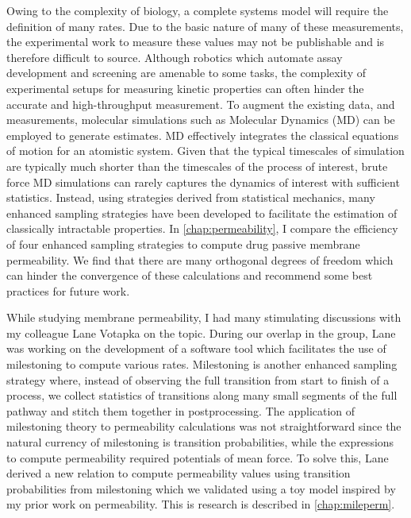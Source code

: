 \par Owing to the complexity of biology, a complete systems model will require the definition of many rates.
Due to the basic nature of many of these measurements, the experimental work to measure these values may not be publishable and is therefore difficult to source.
Although robotics which automate assay development and screening are amenable to some tasks, the complexity of experimental setups for measuring kinetic properties can often hinder the accurate and high-throughput measurement.
To augment the existing data, and measurements, molecular simulations such as Molecular Dynamics (MD) can be employed to generate estimates\cite{Leach2001,Durrant2011a}.
MD effectively integrates the classical equations of motion for an atomistic system.
Given that the typical timescales of simulation are typically much shorter than the timescales of the process of interest, brute force MD simulations can rarely captures the dynamics of interest with sufficient statistics.
Instead, using strategies derived from statistical mechanics, many enhanced sampling strategies have been developed to facilitate the estimation of classically intractable properties\cite{Chipot2007,Tuckerman2010}.
In \cref{chap:permeability}, I compare the efficiency of four enhanced sampling strategies to compute drug passive membrane permeability.
We find that there are many orthogonal degrees of freedom which can hinder the convergence of these calculations and recommend some best practices for future work.

\par While studying membrane permeability, I had many stimulating discussions with my colleague Lane Votapka on the topic.
During our overlap in the group, Lane was working on the development of a software tool which facilitates the use of milestoning to compute various rates.
Milestoning is another enhanced sampling strategy where, instead of observing the full transition from start to finish of a process, we collect statistics of transitions along many small segments of the full pathway and stitch them together in postprocessing\cite{Faradjian2004,Majek2010,Vanden-Eijnden2008,Kirmizialtin2011,Votapka2015,Bello-Rivas2015,Votapka2017c}.
The application of milestoning theory to permeability calculations was not straightforward since the natural currency of milestoning is transition probabilities, while the expressions to compute permeability required potentials of mean force.
To solve this, Lane derived a new relation to compute permeability values using transition probabilities from milestoning which we validated using a toy model inspired by my prior work on permeability.
This is research is described in \cref{chap:mileperm}.

